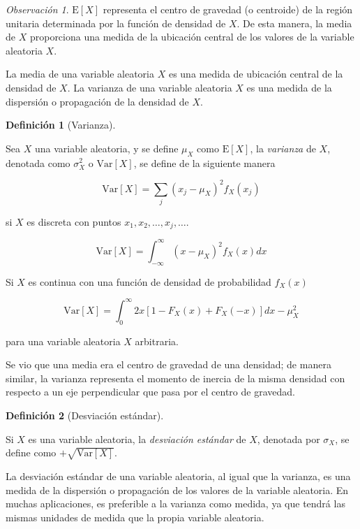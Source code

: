 \documentclass[
  us-letterpaper,
]{scrreprt}
\theoremstyle{definition}
\theoremstyle{plain}
\theoremstyle{plain}
\theoremstyle{definition}
\newtheorem{definition}{Definición}[chapter]
\theoremstyle{remark}
\newtheorem*{remark}{Observación}
\begin{document}
\begin{remark}
\(\mathrm E[X]\) representa el centro de gravedad (o centroide) de la
región unitaria determinada por la función de densidad de \(X\). De esta
manera, la media de \(X\) proporciona una medida de la ubicación central
de los valores de la variable aleatoria \(X\).
\end{remark}

La media de una variable aleatoria \(X\) es una medida de ubicación
central de la densidad de \(X\). La varianza de una variable aleatoria
\(X\) es una medida de la dispersión o propagación de la densidad de
\(X\).

\begin{definition}[Varianza]\protect\hypertarget{def-var}{}\label{def-var}

Sea \(X\) una variable aleatoria, y se define \(\mu_X\) como
\(\mathrm E[X]\), la \emph{varianza} de \(X\), denotada como
\(\sigma_X^2\) o \(\mathrm{Var}[X]\), se define de la siguiente manera

\[ \mathrm{Var}[X]= \sum_j (x_j-\mu_X)^2 f_X(x_j) \]

si \(X\) es discreta con puntos \(x_1, x_2, \ldots, x_j, \ldots\).

\[ \mathrm{Var}[X]=\int_{-\infty}^\infty (x-\mu_X)^2f_X(x)dx \]

Si \(X\) es continua con una función de densidad de probabilidad
\(f_X(x)\)

\[ \mathrm{Var}[X]=\int_0^\infty 2x[1-F_X(x)+F_X(-x)]dx - \mu_X^2 \]

para una variable aleatoria \(X\) arbitraria.

\end{definition}

Se vio que una media era el centro de gravedad de una densidad; de
manera similar, la varianza representa el momento de inercia de la misma
densidad con respecto a un eje perpendicular que pasa por el centro de
gravedad.

\begin{definition}[Desviación
estándar]\protect\hypertarget{def-SD}{}\label{def-SD}

Si \(X\) es una variable aleatoria, la \emph{desviación estándar} de
\(X\), denotada por \(\sigma_X\), se define como
\(+\sqrt{\mathrm{Var}[X]}\).

\end{definition}

La desviación estándar de una variable aleatoria, al igual que la
varianza, es una medida de la dispersión o propagación de los valores de
la variable aleatoria. En muchas aplicaciones, es preferible a la
varianza como medida, ya que tendrá las mismas unidades de medida que la
propia variable aleatoria.
\end{document}
